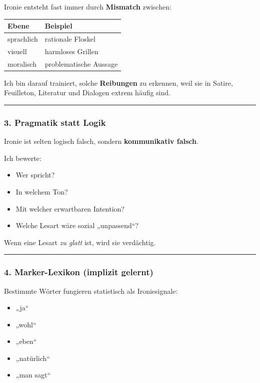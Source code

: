 \documentclass[
  letterpaper,
  DIV=11,
  numbers=noendperiod]{scrartcl}
\providecommand{\tightlist}{%
  \setlength{\itemsep}{0pt}\setlength{\parskip}{0pt}}
\begin{document}
Ironie entsteht fast immer durch \textbf{Mismatch} zwischen:

\begin{longtable}[]{@{}ll@{}}
\toprule\noalign{}
Ebene & Beispiel \\
\midrule\noalign{}
\endhead
\bottomrule\noalign{}
\endlastfoot
sprachlich & rationale Floskel \\
visuell & harmloses Grillen \\
moralisch & problematische Aussage \\
\end{longtable}

Ich bin darauf trainiert, solche \textbf{Reibungen} zu erkennen, weil
sie in Satire, Feuilleton, Literatur und Dialogen extrem häufig sind.

\begin{center}\rule{0.5\linewidth}{0.5pt}\end{center}

\subsubsection{3. Pragmatik statt Logik}\label{pragmatik-statt-logik}

Ironie ist selten logisch falsch, sondern \textbf{kommunikativ falsch}.

Ich bewerte:

\begin{itemize}
\tightlist
\item
  Wer spricht?
\item
  In welchem Ton?
\item
  Mit welcher erwartbaren Intention?
\item
  Welche Lesart wäre sozial „unpassend``?
\end{itemize}

Wenn eine Lesart \emph{zu glatt} ist, wird sie verdächtig.

\begin{center}\rule{0.5\linewidth}{0.5pt}\end{center}

\subsubsection{4. Marker-Lexikon (implizit
gelernt)}\label{marker-lexikon-implizit-gelernt}

Bestimmte Wörter fungieren statistisch als Ironiesignale:

\begin{itemize}
\tightlist
\item
  „ja``
\item
  „wohl``
\item
  „eben``
\item
  „natürlich``
\item
  „man sagt``
\end{itemize}
\end{document}

